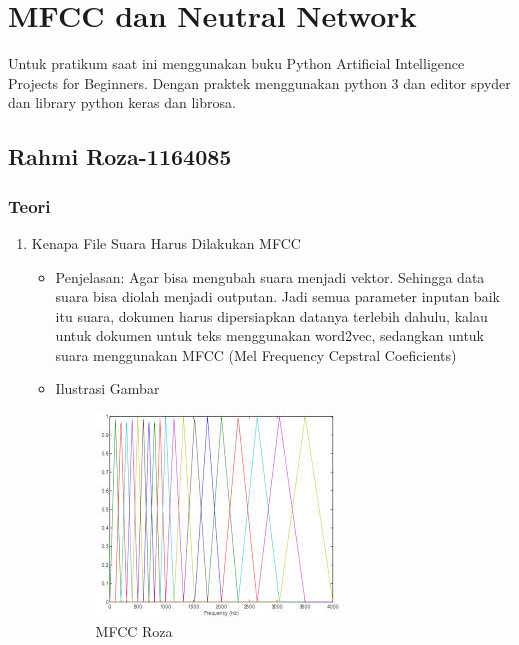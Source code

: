 \chapter{MFCC dan Neutral Network}
Untuk pratikum saat ini menggunakan buku Python Artificial Intelligence Projects for Beginners. Dengan praktek menggunakan python 3 dan editor spyder dan library python keras dan librosa.

\section{Rahmi Roza-1164085}
\subsection{Teori}
\begin{enumerate}
\item Kenapa File Suara Harus Dilakukan MFCC
\begin{itemize}
\item Penjelasan: Agar bisa mengubah suara menjadi vektor. Sehingga data suara bisa diolah menjadi outputan. Jadi semua parameter inputan baik itu suara, dokumen harus dipersiapkan datanya terlebih dahulu, kalau untuk dokumen untuk teks menggunakan word2vec, sedangkan untuk suara menggunakan MFCC (Mel Frequency Cepstral Coeficients) 
\par 
\par
\item Ilustrasi Gambar
\begin{figure}[!hbtp]
\centering
\includegraphics[scale=0.7]{figures/mfccroza.jpg}
\caption{MFCC Roza}
\label{text-fadila}
\end{figure}
\par
\end{itemize}
\par
\par


\end{enumerate}
